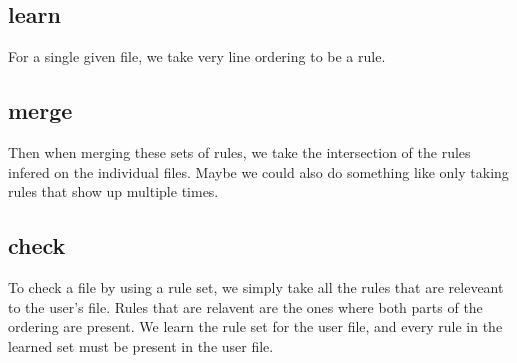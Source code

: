 \subsection{learn}
  For a single given file, we take very line ordering to be a rule.
\subsection{merge}
  Then when merging these sets of rules, we take the intersection of the rules infered on the individual files.
  Maybe we could also do something like only taking rules that show up multiple times.
\subsection{check}
  To check a file by using a rule set, we simply take all the rules that are releveant to the user's file.
  Rules that are relavent are the ones where both parts of the ordering are present.
  We learn the rule set for the user file, and every rule in the learned set must be present in the user file.
